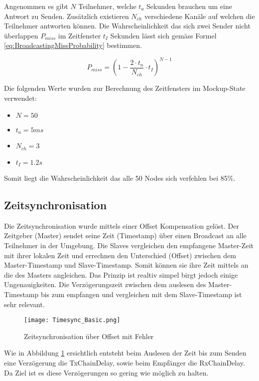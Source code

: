 Angenommen es gibt $N$ Teilnehmer, welche $t_a$ Sekunden brauchen um eine Antwort zu Senden. Zusätzlich existieren $N_{ch}$ verschiedene Kanäle auf welchen die Teilnehmer antworten können. Die Wahrscheinlichkeit das sich zwei Sender nicht überlappen $P_{miss}$ im Zeitfenster $t_I$ Sekunden lässt sich gemäss Formel \ref{eq:BroadcastingMissProbability} bestimmen. \cite{rk_how_to_deal_with_broadcasting_collision_2020}

\begin{equation}\label{eq:BroadcastingMissProbability}
P_{miss} = (1- \frac{2 \cdot t_a}{N_{ch}} \cdot t_I)^{N-1}
\end{equation}

Die folgenden Werte wurden zur Berechnung des Zeitfensters im Mockup-State verwendet:

\begin{itemize}
	\item $N = 50$
	\item $t_a = 5ms$
	\item $N_{ch} = 3$
	\item $t_I = 1.2s$	
\end{itemize} 

Somit liegt die Wahrscheinlichkeit das alle 50 Nodes sich verfehlen bei 85\%. 

\subsection{Zeitsynchronisation}\label{sec:ZeitsynchronisationP2P}

Die Zeitsynchronisation wurde mittels einer Offset Kompensation gelöst. Der Zeitgeber (Master) sendet seine Zeit (Timestamp) über einen Broadcast an alle Teilnehmer in der Umgebung. Die Slaves vergleichen den empfangene Master-Zeit mit ihrer lokalen Zeit und errechnen den Unterschied (Offset) zwischen dem Master-Timestamp und Slave-Timestamp. Somit können sie ihre Zeit mittels an die des Masters angleichen. Das Prinzip ist realtiv simpel birgt jedoch einige Ungenauigkeiten. Die Verzögerungszeit zwischen dem auslesen des Master-Timestamp bis zum empfangen und vergleichen mit dem Slave-Timestamp ist sehr relevant.  

\begin{figure} [H]
	\centering
	\texttt{[image: Timesync\_Basic.png]}
	\caption{Zeitsynchronisation über Offset mit Fehler}
	\label{fig:TimesyncBasicwithErrorP2P}
\end{figure}

Wie in Abbildung \ref{fig:TimesyncBasicwithErrorP2P} ersichtlich entsteht beim Auslesen der Zeit bis zum Senden eine Verzögerung die TxChainDelay, sowie beim Empfänger die RxChainDelay. Da Ziel ist es diese Verzögerungen so gering wie möglich zu halten. 

